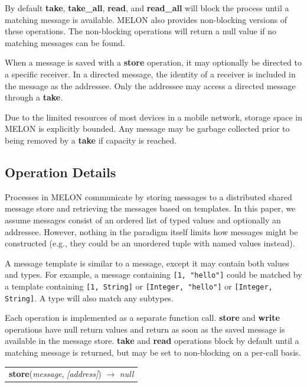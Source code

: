 \documentclass[lnicst]{svmultln}
\begin{document}
By default \textbf{take}, \textbf{take\_all}, \textbf{read}, and \textbf{read\_all} will block the process until a matching message is available. MELON also provides non-blocking versions of these operations. The non-blocking operations will return a null value if no matching messages can be found.

When a message is saved with a \textbf{store} operation, it may optionally be directed to a specific receiver. In a directed message, the identity of a receiver is included in the message as the addressee. Only the addressee may access a directed message through a \textbf{take}.

Due to the limited resources of most devices in a mobile network, storage space in MELON is explicitly bounded. Any message may be garbage collected prior to being removed by a \textbf{take} if capacity is reached.

\subsection{Operation Details}

Processes in MELON communicate by storing messages to a distributed shared message store and retrieving the messages based on templates. In this paper, we assume messages consist of an ordered list of typed values and optionally an addressee. However, nothing in the paradigm itself limits how messages might be constructed (e.g., they could be an unordered tuple with named values instead).

A message template is similar to a message, except it may contain both values and types. For example, a message containing \texttt{[1, "hello"]} could be matched by a template containing \texttt{[1, String]} or \texttt{[Integer, "hello"]} or \texttt{[Integer, String]}. A type will also match any subtypes.

Each operation is implemented as a separate function call. \textbf{store} and \textbf{write} operations have null return values and return as soon as the saved message is available in the message store. \textbf{take} and \textbf{read} operations block by default until a matching message is returned, but may be set to non-blocking on a per-call basis.

\begin{table}
\begin{tabular}{c}
\textbf{store}(\textit{message}, \textit{[address]}) $\rightarrow$ \textit{null}
\end{tabular}
\end{table}
\end{document}
